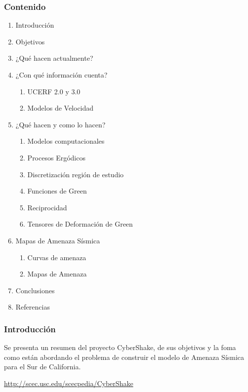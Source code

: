 \begin{frame}[plain]
 \titlepage
\end{frame}
\begin{frame}[allowframebreaks]
\frametitle{\large{Contenido}}
\begin{enumerate}
\item Introducción
\item Objetivos
\item ¿Qué hacen actualmente?
\item ¿Con qué información cuenta?
	\begin{enumerate}
		\item UCERF 2.0 y 3.0
		\item Modelos de Velocidad
	\end{enumerate}
\item ¿Qué hacen y como lo hacen?
	\begin{enumerate}
		\item Modelos computacionales
		\item Procesos Ergódicos
		\item Discretización región de estudio
		\item Funciones de Green
		\item Reciprocidad
		\item Tensores de Deformación de Green
	\end{enumerate}
\item Mapas de Amenaza Sísmica
	\begin{enumerate}
		\item Curvas de amenaza
		\item Mapas de Amenaza
	\end{enumerate}
\item Conclusiones
\item Referencias
\end{enumerate}
\end{frame}
%
%
\begin{frame}
\frametitle{Introducción}
%
\justifying
Se presenta un resumen del proyecto {C}yber{S}hake, de sus objetivos y la foma como están abordando el problema de construir el modelo de Amenaza Sísmica para el Sur de California.

\url{http://scec.usc.edu/scecpedia/CyberShake}
%
\end{frame}
